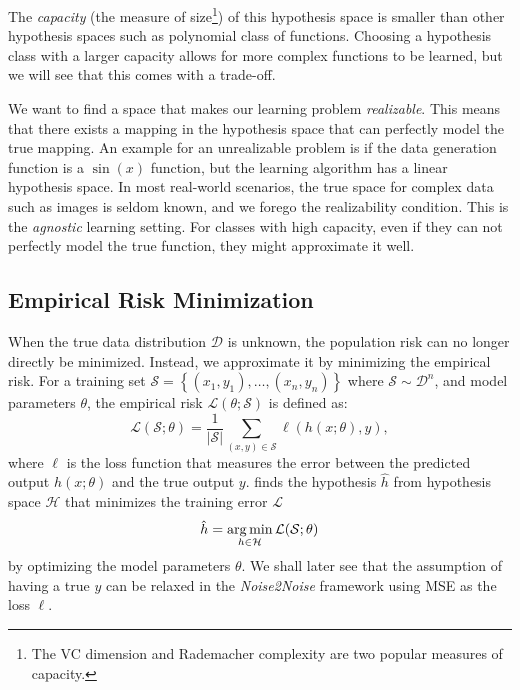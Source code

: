 The \textit{capacity} (the measure of size\footnote{The VC dimension and Rademacher complexity are two popular measures of capacity.}) of this hypothesis space is smaller than other hypothesis spaces such as polynomial class of functions. Choosing a hypothesis class with a larger capacity allows for more complex functions to be learned, but we will see that this comes with a trade-off.

We want to find a space that makes our learning problem \textit{realizable}. This means that there exists a mapping in the hypothesis space that can perfectly model the true mapping. An example for an unrealizable problem is if the data generation function is a $\sin(x)$ function, but the learning algorithm has a linear hypothesis space. In most real-world scenarios, the true space for complex data such as images is seldom known, and we forego the realizability condition. This is the \textit{agnostic} learning setting. For classes with high capacity, even if they can not perfectly model the true function, they might approximate it well.

\subsection{Empirical Risk Minimization}
When the true data distribution $\mathcal{D}$ is unknown, the population risk can no longer directly be minimized. Instead, we approximate it by minimizing the empirical risk. For a training set $\mathcal{S} = \left\{ (x_1, y_1), \ldots, (x_n, y_n) \right\}$ where $\mathcal{S} \sim \mathcal{D}^n$, and model parameters $\theta$, the empirical risk $\mathcal{L}(\theta; \mathcal{S})$ is defined as:
\begin{equation}
    \mathcal{L}(\mathcal{S}; \theta) = \frac{1}{\lvert \mathcal{S} \rvert} \sum_{(x, y) \in \mathcal{S}} \ell(h(x; \theta), y),
\end{equation}
where $\ell$ is the loss function that measures the error between the predicted output $h(x; \theta)$ and the true output $y$.  finds the hypothesis $\hat{h}$ from hypothesis space $\mathcal{H}$ that minimizes the training error $\mathcal{L}$
\begin{equation}
    \hat{h} = \operatorname*{arg\,min}_{h \in \mathcal{H}} \mathcal{L}(\mathcal{S};\theta)
\end{equation}
by optimizing the model parameters $\theta$.
We shall later see that the assumption of having a true $y$ can be relaxed in the \textit{Noise2Noise} framework using \gls{MSE} as the loss $\ell$. 

